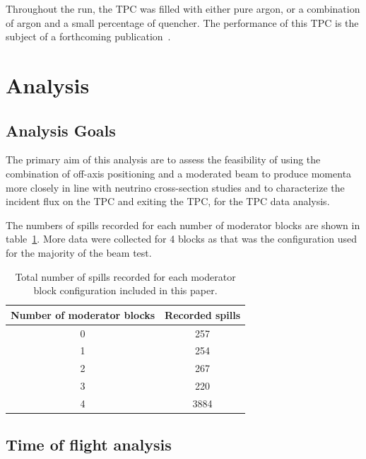 Throughout the run, the TPC was filled with either pure argon, or a combination of argon and a small percentage of quencher.
The performance of this TPC is the subject of a forthcoming publication~\cite{Deisting:2020aaa}.

\section{Analysis}
\label{hptpcPaper:sec:Analysis}
\subsection{Analysis Goals}

The primary aim of this analysis are to assess the feasibility of using the combination of off-axis positioning and a moderated beam to produce momenta more closely in line with neutrino cross-section studies and to characterize the incident flux on the TPC and exiting the TPC, for the TPC data analysis.

The numbers of spills recorded for each number of moderator blocks are shown in table~\ref{tab:spills}.
More data were collected for 4 blocks as that was the configuration used for the majority of the beam test.

\begin{table}
  \centering
  \caption{Total number of spills recorded for each moderator block configuration included in this paper.}
  \begin{tabular}{|c|c|}
    \hline
    Number of moderator blocks & Recorded spills \\
    \hline
    0 & 257 \\
    1 & 254 \\
    2 & 267 \\
    3 & 220 \\
    4 & 3884 \\
    \hline
  \end{tabular}
  \label{tab:spills}
\end{table}


\subsection{Time of flight analysis}
\label{timeofflightanalysissubsec}


